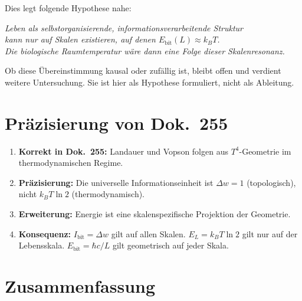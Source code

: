 Dies legt folgende Hypothese nahe:

\begin{center}
\textit{Leben als selbstorganisierende, informationsverarbeitende Struktur\\
kann nur auf Skalen existieren, auf denen \(E_\text{bit}(L) \approx k_BT\).\\
Die biologische Raumtemperatur wäre dann eine Folge dieser Skalenresonanz.}
\end{center}

Ob diese Übereinstimmung kausal oder zufällig ist, bleibt offen
und verdient weitere Untersuchung.
Sie ist hier als Hypothese formuliert, nicht als Ableitung.

\section{Präzisierung von Dok.~255}

\begin{enumerate}
  \item \textbf{Korrekt in Dok.~255:}
        Landauer und Vopson folgen aus \(T^4\)-Geometrie
        im thermodynamischen Regime.
  \item \textbf{Präzisierung:}
        Die universelle Informationseinheit ist \(\Delta w = 1\)
        (topologisch), nicht \(k_BT\ln2\) (thermodynamisch).
  \item \textbf{Erweiterung:}
        Energie ist eine skalenspezifische Projektion der Geometrie.
  \item \textbf{Konsequenz:}
        \(I_\text{bit} = \Delta w\) gilt auf allen Skalen.
        \(E_L = k_BT\ln2\) gilt nur auf der Lebensskala.
        \(E_\text{bit} = \hbar c/L\) gilt geometrisch auf jeder Skala.
\end{enumerate}

\section{Zusammenfassung}

